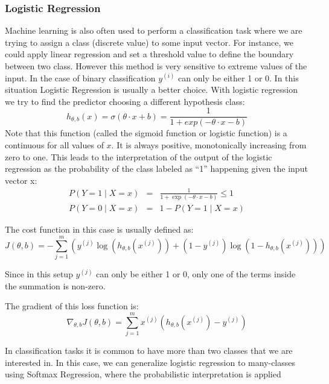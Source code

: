 \documentclass{article}
\begin{document}
\subsubsection{Logistic Regression}
\label{subsubsec:Logistic-Regression}
Machine learning is also often used to perform a classification task where we are trying to assign a class (discrete value) to some input vector. For instance, we could apply linear regression and set a  threshold value to define the boundary between two class. However this method is very sensitive to extreme values of the input. In the case of binary classification $y^{(i)}$ can only be either 1 or 0. In this situation Logistic Regression is usually a better choice. With logistic regression we try to find the predictor choosing a different hypothesis class: 
\begin{equation}
h_{ \theta, b } (x) = \sigma ( \theta \cdot x + b) = \frac{1}{ 1 + exp(-\theta \cdot x - b) }
\label{def:logistic-regression}
\end{equation}
Note that this function (called the sigmoid function or logistic function) is a continuous for all values of $x$. It is always positive, monotonically increasing from zero to one. This leads to the interpretation of the output of the logistic regression as the probability of the class labeled as “1” happening given the input vector x: 
\begin{eqnarray}
P( Y=1 \mid  X = x ) &=& \frac{1}{ 1 + \exp(-\theta \cdot x - b)} \leqslant 1 \\
P( Y=0 \mid  X = x ) &=& 1 - P( Y=1 \mid  X = x )
\end{eqnarray}

The cost function in this case is usually defined as:
\begin{equation}
J(\theta,b) = - \sum _{j= 1}^m ( y^{(j)} \log(h_{\theta,b}(x^{(j)})) + (1-y^{(j)}) \log(1- h_{\theta,b}(x^{(j)})) )
\end{equation}

Since in this setup $y^{(j)}$ can only be either 1 or 0, only one of the terms inside the summation is non-zero.

The gradient of this loss function is:
\begin{equation}
\nabla _{\theta,b} J(\theta,b) = \sum _{j= 1}^m x^{(j)} ( h_{\theta,b}(x^{(j)}) - y^{(j)} )
\end{equation}

In classification tasks it is common to have more than two classes that we are interested in. In this case, we can generalize logistic regression to many-classes using Softmax Regression, where the probabilistic interpretation is applied
\end{document}
